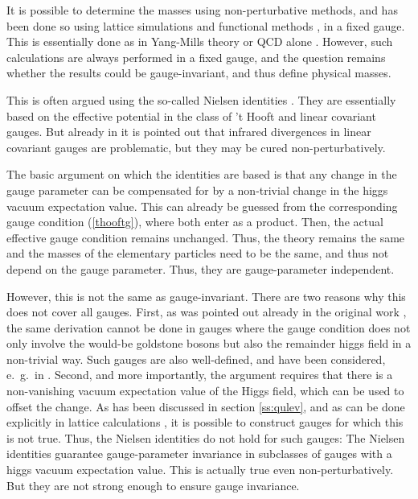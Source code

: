 \documentclass[final,twoside,12pt]{article}
\newcommand*{\pref}[1]{(\ref{#1})}
\newcommand*{\1}{1\!\!\!\bot}
\begin{document}
It is possible to determine the masses using non-perturbative methods, and has been done so using lattice simulations \cite{Karsch:1996aw,Maas:2010nc,Maas:2012tj,Maas:2013aia,Maas:2016edk,Maas:2016ngo,Maas:2018sqz} and functional methods \cite{Benes:2008ir,Fister:2010yw}, in a fixed gauge. This is essentially done as in Yang-Mills theory or QCD alone \cite{Maas:2011se}. However, such calculations are always performed in a fixed gauge, and the question remains whether the results could be gauge-invariant, and thus define physical masses.

This is often argued using the so-called Nielsen identities \cite{Nielsen:1975fs}. They are essentially based on the effective potential in the class of 't Hooft and linear covariant gauges. But already in \cite{Nielsen:1975fs} it is pointed out that infrared divergences in linear covariant gauges are problematic, but they may be cured non-perturbatively.

The basic argument on which the identities are based is that any change in the gauge parameter can be compensated for by a non-trivial change in the higgs vacuum expectation value. This can already be guessed from the corresponding gauge condition \pref{thooftg}, where both enter as a product. Then, the actual effective gauge condition remains unchanged. Thus, the theory remains the same and the masses of the elementary particles need to be the same, and thus not depend on the gauge parameter. Thus, they are gauge-parameter independent. 

However, this is not the same as gauge-invariant. There are two reasons why this does not cover all gauges. First, as was pointed out already in the original work \cite{Nielsen:1975fs}, the same derivation cannot be done in gauges where the gauge condition does not only involve the would-be goldstone bosons but also the remainder higgs field in a non-trivial way. Such gauges are also well-defined, and have been considered, e.\ g.\ in \cite{Dolan:1974gu}. Second, and more importantly, the argument requires that there is a non-vanishing vacuum expectation value of the Higgs field, which can be used to offset the change. As has been discussed in section \ref{ss:qulev}, and as can be done explicitly in lattice calculations \cite{Maas:2012ct}, it is possible to construct gauges for which this is not true. Thus, the Nielsen identities do not hold for such gauges: The Nielsen identities guarantee gauge-parameter invariance in subclasses of gauges with a higgs vacuum expectation value. This is actually true even non-perturbatively. But they are not strong enough to ensure gauge invariance.
\end{document}
